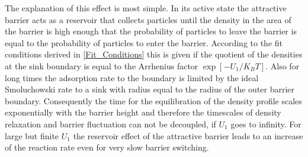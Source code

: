 The explanation of this effect is most simple. In its active state the attractive barrier acts as a reservoir that collects particles until the density in the area of the barrier is high enough that the probability of particles to leave the barrier is equal to the probability of particles to enter the barrier. According to the fit conditions derived in \ref{Fit_Conditions} this is given if the quotient of the densities at the sink boundary is equal to the Arrhenius factor $\exp[-U_1/K_B T]$. Also for long times the adsorption rate to the boundary is limited by the ideal Smoluchowski rate to a sink with radius equal to the radius of the outer barrier boundary. Consequently the time for the equilibration of the density profile scales exponentially with the barrier height and therefore the timescales of density relaxation and barrier fluctuation can not be decoupled, if $U_1$ goes to infinity. For large but finite $U_1$ the reservoir effect of the attractive barrier leads to an increase of the reaction rate even for very slow barrier switching.
\newpage
